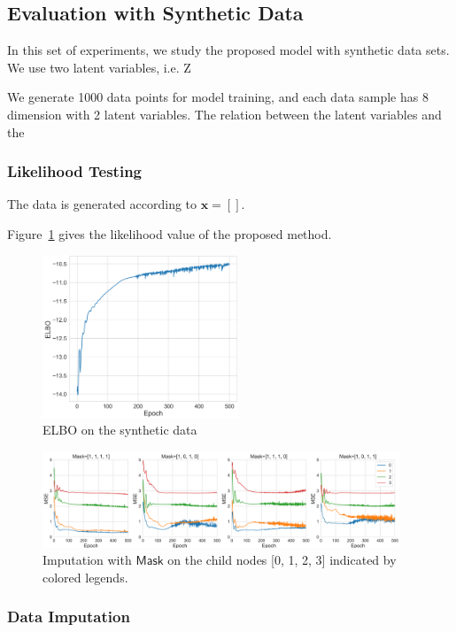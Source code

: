 \documentclass[conference]{IEEEtran}
\begin{document}
\subsection{Evaluation with Synthetic  Data  }
In this set of experiments, we study the proposed model with synthetic data sets.
We use two latent variables, i.e. Z

We generate 1000 data points for model training, and each data sample  has 8 dimension with 2 latent variables.  The relation between the latent variables and the 

\subsubsection{Likelihood Testing}

The data is generated according to $\mathbf{x} = []$. 

Figure~\ref{fig:elbo} gives the likelihood value of the proposed method. 

\begin{figure}[!htbp]
    \centering
    \includegraphics[width=2.3in]{fig/elbo.png}
    \caption{ELBO on the synthetic data}
    \label{fig:elbo}
\end{figure}

\begin{figure}[!htbp]
    \centering
    \includegraphics[width=0.95\textwidth]{fig/mse.png}
    \caption{Imputation with $\mathsf{Mask}$ on the child nodes [0, 1, 2, 3] indicated by colored legends. }
    \label{fig:mse}
\end{figure}

\subsubsection{Data Imputation}
\end{document}
